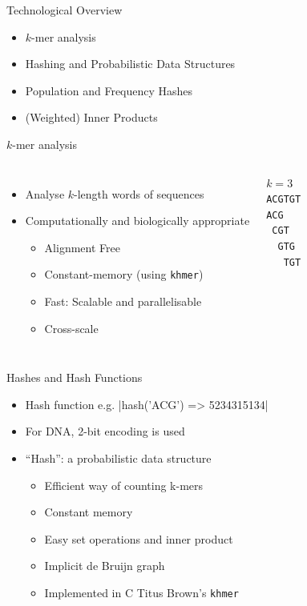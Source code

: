 \documentclass[t]{beamer}
\begin{document}
\begin{frame}{Technological Overview}
  \begin{itemize}
    \item $k$-mer analysis
    \item Hashing and Probabilistic Data Structures
    \item Population and Frequency Hashes
    \item (Weighted) Inner Products
  \end{itemize}
\end{frame}

\begin{frame}{$k$-mer analysis}
  \begin{columns}[t]
      \begin{itemize}
        \item<1-> Analyse $k$-length words of sequences
        \item<2> Computationally and biologically appropriate
        \begin{itemize}
          \item<2> Alignment Free
          \item<2> Constant-memory (using \texttt{khmer})
          \item<2> Fast: Scalable and parallelisable
          \item<2> Cross-scale
        \end{itemize}
      \end{itemize}
      \vfill
    $k = 3$\\
    \texttt{ACGTGT}\\
    \texttt{ACG~~~}\\
    \texttt{~CGT~~}\\
    \texttt{~~GTG~}\\
    \texttt{~~~TGT}
  \end{columns}
\end{frame}

\begin{frame}{Hashes and Hash Functions}
  \begin{itemize}
    \item Hash function e.g. |hash('ACG') => 5234315134|
    \item For DNA, 2-bit encoding is used
      \pause
    \item ``Hash'': a probabilistic data structure
      \begin{itemize}
        \item Efficient way of counting k-mers
        \item Constant memory
        \item Easy set operations and inner product
        \item Implicit de Bruijn graph
        \item Implemented in C Titus Brown's \texttt{khmer}
      \end{itemize}
  \end{itemize}
\end{frame}
\end{document}
